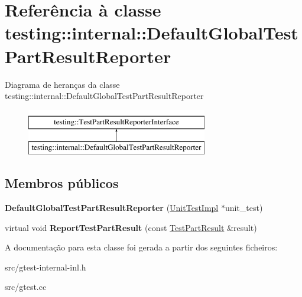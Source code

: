 \hypertarget{classtesting_1_1internal_1_1DefaultGlobalTestPartResultReporter}{\section{Referência à classe testing\-:\-:internal\-:\-:Default\-Global\-Test\-Part\-Result\-Reporter}
\label{classtesting_1_1internal_1_1DefaultGlobalTestPartResultReporter}
}
Diagrama de heranças da classe testing\-:\-:internal\-:\-:Default\-Global\-Test\-Part\-Result\-Reporter\begin{figure}[H]
\begin{center}
\leavevmode
\includegraphics[height=2.000000cm]{classtesting_1_1internal_1_1DefaultGlobalTestPartResultReporter}
\end{center}
\end{figure}
\subsection*{Membros públicos}
\begin{DoxyCompactItemize}
\item 
\hypertarget{classtesting_1_1internal_1_1DefaultGlobalTestPartResultReporter_a3900ea7f34b34afd48c7d1d0312a1488}{{\bfseries Default\-Global\-Test\-Part\-Result\-Reporter} (\hyperlink{classtesting_1_1internal_1_1UnitTestImpl}{Unit\-Test\-Impl} $\ast$unit\-\_\-test)}\label{classtesting_1_1internal_1_1DefaultGlobalTestPartResultReporter_a3900ea7f34b34afd48c7d1d0312a1488}

\item 
\hypertarget{classtesting_1_1internal_1_1DefaultGlobalTestPartResultReporter_a6081576a23b964cfecab1e424d8044fc}{virtual void {\bfseries Report\-Test\-Part\-Result} (const \hyperlink{classtesting_1_1TestPartResult}{Test\-Part\-Result} \&result)}\label{classtesting_1_1internal_1_1DefaultGlobalTestPartResultReporter_a6081576a23b964cfecab1e424d8044fc}

\end{DoxyCompactItemize}


A documentação para esta classe foi gerada a partir dos seguintes ficheiros\-:\begin{DoxyCompactItemize}
\item 
src/gtest-\/internal-\/inl.\-h\item 
src/gtest.\-cc\end{DoxyCompactItemize}
